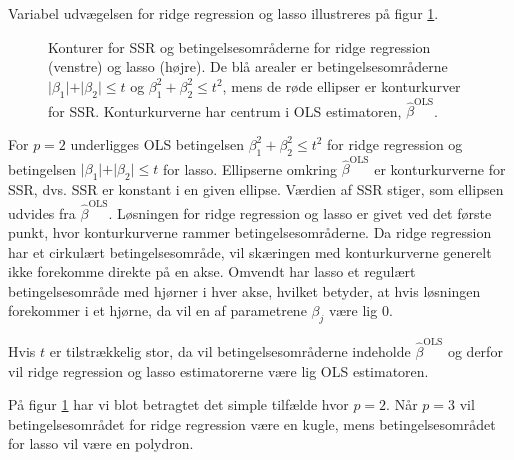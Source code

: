 Variabel udvægelsen for ridge regression og lasso illustreres på figur \ref{fig:LassoRig}.
\begin{figure}[H]
\centering
\begin{minipage}{0.4\linewidth}
\scalebox{0.7}{}
\end{minipage}
\hspace{0.2cm}
\begin{minipage}{0.4\linewidth}
\scalebox{0.7}{}
\end{minipage}
\caption{Konturer for SSR og betingelsesområderne for ridge regression (venstre) og lasso (højre). De blå arealer er betingelsesområderne $\vert \beta_1 \vert+\vert \beta_2 \vert \leq t$ og $\beta_1^2+\beta_2^2 \leq t^2$, mens de røde ellipser er konturkurver for SSR. Konturkurverne har centrum i OLS estimatoren, $\hat{\beta}^\text{OLS}$.} \label{fig:LassoRig}
\end{figure}
For $p=2$ underligges OLS betingelsen $\beta_1^2 + \beta_2^2 \leq t^2$ for ridge regression og betingelsen $\vert \beta_1 \vert + \vert \beta_2 \vert \leq t$ for lasso.
Ellipserne omkring $\hat{\beta}^{\text{OLS}}$ er konturkurverne for SSR, dvs. SSR er konstant i en given ellipse. Værdien af SSR stiger, som ellipsen udvides fra $\hat{\beta}^{\text{OLS}}$.
Løsningen for ridge regression og lasso er givet ved det første punkt, hvor konturkurverne rammer betingelsesområderne.
Da ridge regression har et cirkulært betingelsesområde, vil skæringen med konturkurverne generelt ikke forekomme direkte på en akse.
Omvendt har lasso et regulært betingelsesområde med hjørner i hver akse, hvilket betyder, at hvis løsningen forekommer i et hjørne, da vil en af parametrene $\beta_j$ være lig 0.

Hvis $t$ er tilstrækkelig stor, da vil betingelsesområderne indeholde $\hat{\beta}^{\text{OLS}}$ og derfor vil ridge regression og lasso estimatorerne være lig OLS estimatoren.

På figur \ref{fig:LassoRig} har vi blot betragtet det simple tilfælde hvor $p=2$. Når $p=3$ vil betingelsesområdet for ridge regression være en kugle, mens betingelsesområdet for lasso vil være en polydron. 

